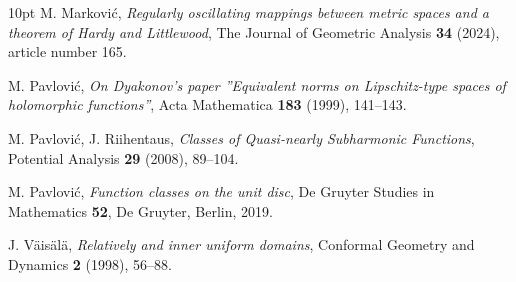 \documentclass{amsart}
\theoremstyle{definition}
\numberwithin{equation}{section}
\begin{document}
\begin{thebibliography}{10pt}
M. Markovi\'{c}, \textit{Regularly oscillating mappings between metric spaces and a theorem of Hardy and Littlewood},
The Journal of Geometric Analysis \textbf{34} (2024),  article  number 165.

M. Pavlovi\'{c}, \textit{On Dyakonov's paper ''Equivalent norms on Lipschitz-type spaces of holomorphic functions''},
Acta Mathematica \textbf{183} (1999), 141--143.

M. Pavlovi\'{c}, J. Riihentaus, \textit{Classes of Quasi-nearly Subharmonic Functions},
Potential Analysis \textbf{29} (2008), 89--104.

M. Pavlovi\'{c}, \textit{Function classes on the unit disc},
De  Gruyter Studies in Mathematics \textbf{52}, De Gruyter, Berlin, 2019.

J. V\"{a}is\"{a}l\"{a},
\textit{Relatively and inner uniform domains}, Conformal Geometry and Dynamics \textbf{2} (1998), 56--88.

\end{thebibliography}
\end{document}
